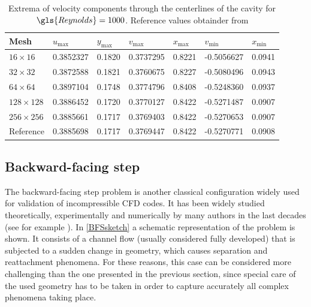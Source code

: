 \begin{table}[]
	\centering
	\begin{tabular}{lllllrr}
		\hline
		Mesh           & $u_{\text{max}}$ & $y_{\text{max}}$ & $v_{\text{max}}$ & $x_{\text{max}}$ & \multicolumn{1}{l}{$v_{\text{min}}$} & \multicolumn{1}{l}{$x_{\text{min}}$} \\ \hline
		$16\times16$   & 0.3852327        & 0.1820           & 0.3737295        & 0.8221           & -0.5056627                           & 0.0941                               \\
		$32\times32$   & 0.3872588        & 0.1821           & 0.3760675        & 0.8227           & -0.5080496                           & 0.0943                               \\
		$64\times64$   & 0.3897104        & 0.1748           & 0.3774796        & 0.8408           & -0.5248360                           & 0.0937                               \\
		$128\times128$ & 0.3886452        & 0.1720           & 0.3770127        & 0.8422           & -0.5271487                           & 0.0907                               \\
		$256\times256$ & 0.3885661        & 0.1717           & 0.3769403        & 0.8422           & -0.5270653                           & 0.0907                               \\\hline
		Reference      & 0.3885698        & 0.1717           & 0.3769447        & 0.8422           & \multicolumn{1}{l}{-0.5270771}       & \multicolumn{1}{l}{0.0908}           \\ \hline
	\end{tabular}
	\caption{Extrema of velocity components through the centerlines of the cavity for $\gls{Reynolds} = 1000$. Reference values obtainder from \cite{botellaBenchmarkSpectralResults1998} }
	\label{tab:LidCavityExtrema}
\end{table}
\FloatBarrier
\newpage

\subsection{Backward-facing step}\label{ssec:BackwardFacingStep}
The backward-facing step problem is another classical configuration widely used for validation of incompressible CFD codes. It has been widely studied theoretically, experimentally and numerically by many authors in the last decades (see for example \cite{armalyExperimentalTheoreticalInvestigation1983,barkleyThreedimensionalInstabilityFlow2000,biswasBackwardFacingStepFlows2004} ).  In \cref{BFSsketch} a schematic representation of the problem is shown. It consists of a channel flow (usually considered fully developed) that is subjected to a sudden change in geometry, which causes separation and reattachment phenomena. For these reasons, this case can be considered more challenging than the one presented in the previous section, since special care of the used geometry has to be taken in order to capture accurately all complex phenomena taking place.

